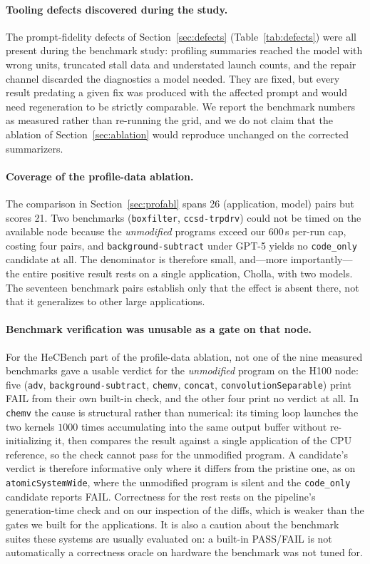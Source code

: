 \paragraph{Tooling defects discovered during the study.}
The prompt-fidelity defects of Section~\ref{sec:defects} (Table~\ref{tab:defects}) were all present
during the benchmark study: profiling summaries reached the model with wrong units, truncated
stall data and understated launch counts, and the repair channel discarded the diagnostics a model
needed. They are fixed, but every result predating a given fix was produced with the affected prompt
and would need regeneration to be strictly comparable. We report the benchmark numbers as measured
rather than re-running the grid, and we do not claim that the ablation of Section~\ref{sec:ablation}
would reproduce unchanged on the corrected summarizers.

\paragraph{Coverage of the profile-data ablation.}
The comparison in Section~\ref{sec:profabl} spans 26 (application, model) pairs but scores 21. Two
benchmarks (\texttt{boxfilter}, \texttt{ccsd-trpdrv}) could not be timed on the available node because
the \emph{unmodified} programs exceed our $600$\,s per-run cap, costing four pairs, and
\texttt{background-subtract} under GPT-5 yields no \texttt{code\_only} candidate at all. The
denominator is therefore small, and---more importantly---the entire positive result rests on a single
application, Cholla, with two models. The seventeen benchmark pairs establish only that the effect is
absent there, not that it generalizes to other large applications.

\paragraph{Benchmark verification was unusable as a gate on that node.}
For the HeCBench part of the profile-data ablation, not one of the nine measured benchmarks gave a
usable verdict for the \emph{unmodified} program on the H100 node: five (\texttt{adv},
\texttt{background-subtract}, \texttt{chemv}, \texttt{concat}, \texttt{convolutionSeparable}) print FAIL
from their own built-in check, and the other four print no verdict at all. In \texttt{chemv} the cause
is structural rather than numerical: its timing loop launches the two kernels $1000$ times accumulating
into the same output buffer without re-initializing it, then compares the result against a single
application of the CPU reference, so the check cannot pass for the unmodified program. A candidate's verdict is therefore informative only where it differs from
the pristine one, as on \texttt{atomicSystemWide}, where the unmodified program is silent and the
\texttt{code\_only} candidate reports FAIL. Correctness for the rest rests on the pipeline's
generation-time check and on our inspection of the diffs, which is weaker than the gates we built for
the applications. It is also a caution about the benchmark suites these systems are usually evaluated
on: a built-in PASS/FAIL is not automatically a correctness oracle on hardware the benchmark was not
tuned for.


